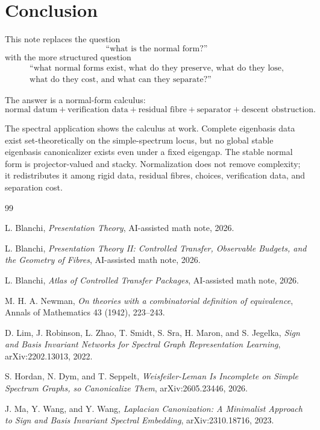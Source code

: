 \documentclass[11pt]{article}
\begin{document}
\section{Conclusion}

This note replaces the question
\[
\text{``what is the normal form?''}
\]
with the more structured question
\[
\begin{gathered}
\text{``what normal forms exist, what do they preserve, what do they lose,}\\
\text{what do they cost, and what can they separate?''}
\end{gathered}
\]

The answer is a normal-form calculus:
\[
\boxed{
\text{normal datum}
+
\text{verification data}
+
\text{residual fibre}
+
\text{separator}
+
\text{descent obstruction}.
}
\]

The spectral application shows the calculus at work. Complete eigenbasis data exist set-theoretically on the simple-spectrum locus, but no global stable eigenbasis canonicalizer exists even under a fixed eigengap. The stable normal form is projector-valued and stacky. Normalization does not remove complexity; it redistributes it among rigid data, residual fibres, choices, verification data, and separation cost.

\begin{thebibliography}{99}

L. Blanchi,
\emph{Presentation Theory},
AI-assisted math note, 2026.

L. Blanchi,
\emph{Presentation Theory II: Controlled Transfer, Observable Budgets, and the Geometry of Fibres},
AI-assisted math note, 2026.

L. Blanchi,
\emph{Atlas of Controlled Transfer Packages},
AI-assisted math note, 2026.

M. H. A. Newman,
\emph{On theories with a combinatorial definition of equivalence},
Annals of Mathematics 43 (1942), 223--243.

D. Lim, J. Robinson, L. Zhao, T. Smidt, S. Sra, H. Maron, and S. Jegelka,
\emph{Sign and Basis Invariant Networks for Spectral Graph Representation Learning},
arXiv:2202.13013, 2022.

S. Hordan, N. Dym, and T. Seppelt,
\emph{Weisfeiler-Leman Is Incomplete on Simple Spectrum Graphs, so Canonicalize Them},
arXiv:2605.23446, 2026.

J. Ma, Y. Wang, and Y. Wang,
\emph{Laplacian Canonization: A Minimalist Approach to Sign and Basis Invariant Spectral Embedding},
arXiv:2310.18716, 2023.

\end{thebibliography}
\end{document}
